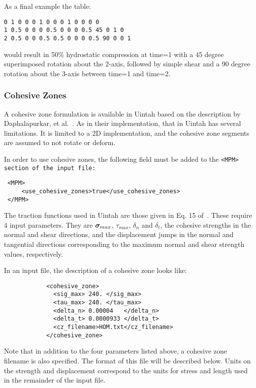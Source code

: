 As a final example the table:
\begin{Verbatim}
0 1 0 0 0 1 0 0 0 1 0 0 0 0
1 0.5 0 0 0 0.5 0 0 0 0.5 45 0 1 0
2 0.5 0 0 0.5 0.5 0 0 0 0.5 90 0 0 1
\end{Verbatim}
would result in 50\% hydrostatic compression at time=1 with a 45 degree superimposed rotation about the 2-axis, followed by  simple shear and a 90 degree rotation about the 3-axis between time=1 and time=2.


\subsubsection{Cohesive Zones} \label{Sec:CohesiveZones}
A cohesive zone formulation is available in Uintah based on the description
by Daphalapurkar, et al.~\cite{Daphalapurkar}.  As in their implementation,
that in Uintah has several limitations.  It is limited to a 2D implementation,
and the cohesive zone segments are assumed to not rotate or deform.

In order to use cohesive zones, the following field must be added to the
\tt <MPM> \normalfont section of the input file:

\begin{Verbatim}
 <MPM>
     <use_cohesive_zones>true</use_cohesive_zones>
 </MPM>
\end{Verbatim}

The traction functions used in Uintah are those given in Eq. 15
of~\cite{Daphalapurkar}.  These require 4 input parameters.  They are
$\sig_{max}$, $\tau_{max}$, $\delta_n$ and $\delta_t$, the cohesive strengths
in the normal and shear directions, and the displacement jumps in the normal and
tangential directions corresponding to the maximum normal and shear strength
values, respectively.

In an input file, the description of a cohesive zone looks like:

\begin{Verbatim}
            <cohesive_zone>
              <sig_max> 240. </sig_max>
              <tau_max> 240. </tau_max>
              <delta_n> 0.00004   </delta_n>
              <delta_t> 0.0000933 </delta_t>
              <cz_filename>HOM.txt</cz_filename>
            </cohesive_zone>
\end{Verbatim}

Note that in addition to the four parameters listed above, a cohesive zone
filename is also specified.  The format of this file will be described below.
Units on the strength and displacement correspond to the units for
stress and length used in the remainder of the input file.

